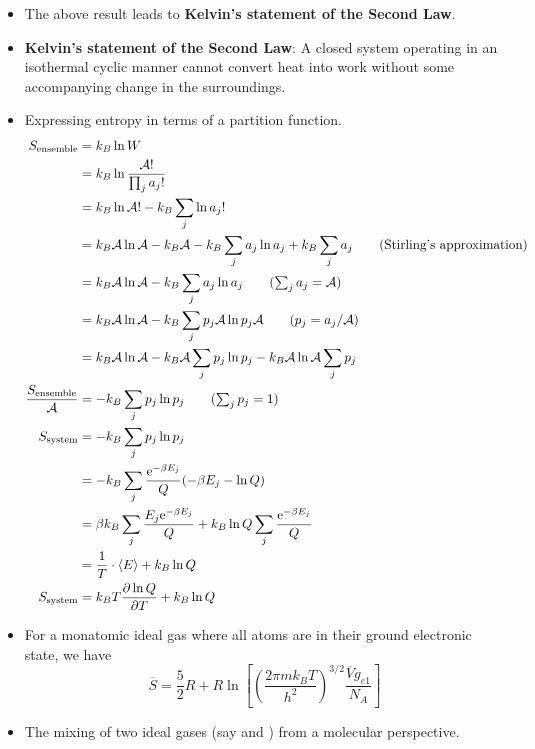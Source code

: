 \documentclass[../notes.tex]{subfiles}
\begin{document}
\begin{itemize}
    \item The above result leads to \textbf{Kelvin's statement of the Second Law}.
    \item \textbf{Kelvin's statement of the Second Law}: A closed system operating in an isothermal cyclic manner cannot convert heat into work without some accompanying change in the surroundings.
    \item Expressing entropy in terms of a partition function.
    \begingroup
    \allowdisplaybreaks
    \begin{align*}
        S_\text{ensemble} &= k_B\ln W\\
        &= k_B\ln\frac{\mathcal{A}!}{\prod_ja_j!}\\
        &= k_B\ln\mathcal{A}!-k_B\sum_j\ln a_j!\\
        &= k_B\mathcal{A}\ln\mathcal{A}-k_B\mathcal{A}-k_B\sum_ja_j\ln a_j+k_B\sum_ja_j\tag{Stirling's approximation}\\
        &= k_B\mathcal{A}\ln\mathcal{A}-k_B\sum_ja_j\ln a_j\tag{$\sum_ja_j=\mathcal{A}$}\\
        &= k_B\mathcal{A}\ln\mathcal{A}-k_B\sum_jp_j\mathcal{A}\ln p_j\mathcal{A}\tag{$p_j=a_j/\mathcal{A}$}\\
        &= k_B\mathcal{A}\ln\mathcal{A}-k_B\mathcal{A}\sum_jp_j\ln p_j-k_B\mathcal{A}\ln\mathcal{A}\sum_jp_j\\
        \frac{S_\text{ensemble}}{\mathcal{A}} &= -k_B\sum_jp_j\ln p_j\tag{$\sum_jp_j=1$}\\
        S_\text{system} &= -k_B\sum_jp_j\ln p_j\\
        &= -k_B\sum_j\frac{\e[-\beta E_j]}{Q}(-\beta E_j-\ln Q)\\
        &= \beta k_B\sum_j\frac{E_j\e[-\beta E_j]}{Q}+k_B\ln Q\sum_j\frac{\e[-\beta E_j]}{Q}\\
        &= \frac{1}{T}\cdot\prb{E}+k_B\ln Q\\
        S_\text{system} &= k_BT\pdv{\ln Q}{T}+k_B\ln Q
    \end{align*}
    \endgroup
    \item For a monatomic ideal gas where all atoms are in their ground electronic state, we have
    \begin{equation*}
        \overline{S} = \frac{5}{2}R+R\ln\left[ \left( \frac{2\pi mk_BT}{h^2} \right)^{3/2}\frac{\overline{V}g_{e1}}{N_A} \right]
    \end{equation*}
    \item The mixing of two ideal gases (say  and ) from a molecular perspective.

\end{itemize}
\end{document}
